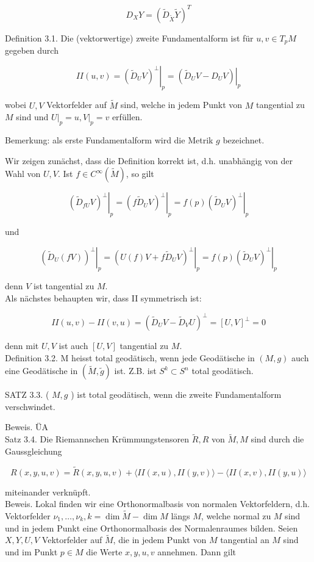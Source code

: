 \documentclass[10pt]{article}
\begin{document}
$$
D_{X} Y=\left(\tilde{D}_{\tilde{X}} \tilde{Y}\right)^{T}
$$

Definition 3.1. Die (vektorwertige) zweite Fundamentalform ist für $u, v \in T_{p} M$ gegeben durch

$$
I I(u, v)=\left.\left(\tilde{D}_{U} V\right)^{\perp}\right|_{p}=\left.\left(\tilde{D}_{U} V-D_{U} V\right)\right|_{p}
$$

wobei $U, V$ Vektorfelder auf $\tilde{M}$ sind, welche in jedem Punkt von $M$ tangential zu $M$ sind und $\left.U\right|_{p}=u,\left.V\right|_{p}=v$ erfüllen.

Bemerkung: als erste Fundamentalform wird die Metrik $g$ bezeichnet.

Wir zeigen zunächst, dass die Definition korrekt ist, d.h. unabhängig von der Wahl von $U, V$. Ist $f \in C^{\infty}(\tilde{M})$, so gilt

$$
\left.\left(\tilde{D}_{f U} V\right)^{\perp}\right|_{p}=\left.\left(f \tilde{D}_{U} V\right)^{\perp}\right|_{p}=\left.f(p)\left(\tilde{D}_{U} V\right)^{\perp}\right|_{p}
$$

und

$$
\left.\left(\tilde{D}_{U}(f V)\right)^{\perp}\right|_{p}=\left.\left(U(f) V+f \tilde{D}_{U} V\right)^{\perp}\right|_{p}=\left.f(p)\left(\tilde{D}_{U} V\right)^{\perp}\right|_{p}
$$

denn $V$ ist tangential zu $M$.\\
Als nächstes behaupten wir, dass II symmetrisch ist:

$$
I I(u, v)-I I(v, u)=\left(\tilde{D}_{U} V-\tilde{D}_{V} U\right)^{\perp}=[U, V]^{\perp}=0
$$

denn mit $U, V$ ist auch $[U, V]$ tangential zu $M$.\\
Definition 3.2. M heisst total geodätisch, wenn jede Geodätische in $(M, g)$ auch eine Geodätische in $(\tilde{M}, \tilde{g})$ ist. Z.B. ist $S^{k} \subset S^{n}$ total geodätisch.

SATZ 3.3. ( $M, g$ ) ist total geodätisch, wenn die zweite Fundamentalform verschwindet.

Beweis. ÜA\\
Satz 3.4. Die Riemannschen Krümmungstensoren $\tilde{R}, R$ von $\tilde{M}, M$ sind durch die Gaussgleichung

$$
R(x, y, u, v)=\tilde{R}(x, y, u, v)+\langle I I(x, u), I I(y, v)\rangle-\langle I I(x, v), I I(y, u)\rangle
$$

miteinander verknüpft.\\
Beweis. Lokal finden wir eine Orthonormalbasis von normalen Vektorfeldern, d.h. Vektorfelder $\nu_{1}, \ldots, \nu_{k}, k=\operatorname{dim} \tilde{M}-\operatorname{dim} M$ längs $M$, welche normal zu $M$ sind und in jedem Punkt eine Orthonormalbasis des Normalenraumes bilden. Seien $X, Y, U, V$ Vektorfelder auf $\tilde{M}$, die in jedem Punkt von $M$ tangential an $M$ sind und im Punkt $p \in M$ die Werte $x, y, u, v$ annehmen. Dann gilt
\end{document}
